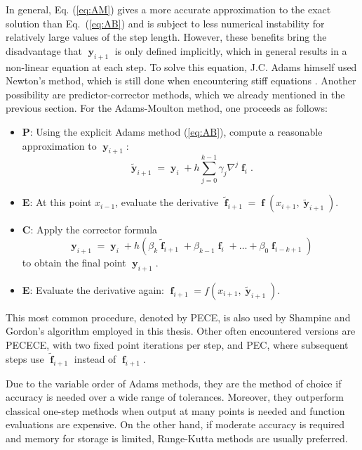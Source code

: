 In general, Eq. (\ref{eq:AM}) gives a more accurate approximation to the exact solution than \mbox{Eq. (\ref{eq:AB})} and is subject to less numerical instability for relatively large values of the step length. However, these benefits bring the disadvantage that $\mbfy_{i+1}$ is only defined implicitly, which in general results in a non-linear equation at each step. To solve this equation, J.C. Adams himself used Newton's method, which is still done when encountering stiff equations \cite{hairer2011solving}. Another possibility are predictor-corrector methods, which we already mentioned in the previous section. For the Adams-Moulton method, one proceeds as follows:
\begin{itemize}
\item[] \textbf{P}: Using the explicit Adams method (\ref{eq:AB}),  compute a reasonable approximation to $\mbfy_{i+1}$:
\[
\tilde{\mbfy}_{i+1} = \mbfy_i + h\sum_{j=0}^{k-1} \gamma_j \nabla^j \mbff_i.
\]
\item[] \textbf{E}: At this point $x_{i-1}$, evaluate the derivative
$
\tilde{\mbff}_{i+1} = \mbff(x_{i+1},\tilde{\mbfy}_{i+1}).
$
\item[] \textbf{C}: Apply the corrector formula
\[
\mbfy_{i+1} = \mbfy_i + h(\beta_k \tilde{\mbff}_{i+1} + \beta_{k-1}\mbff_i + \dots + \beta_0 \mbff_{i-k+1})
\]
to obtain the final point $\mbfy_{i+1}$.
\item[] \textbf{E}: Evaluate the derivative again:
$
\mbff_{i+1} = f(x_{i+1},\tilde{\mbfy}_{i+1})
$.
\end{itemize}
This most common procedure, denoted by PECE, is also used by Shampine and Gordon's algorithm employed in this thesis. Other often encountered versions are PECECE, with two fixed point iterations per step, and PEC, where  subsequent steps use $\tilde{\mbff}_{i+1}$ instead of $\mbff_{i+1}$.

Due to the variable order of Adams methods, they are the method of choice if accuracy is needed over a wide range of tolerances. Moreover, they outperform classical one-step methods when output at many points is needed and function evaluations are expensive. On the other hand, if moderate accuracy is required and memory for storage is limited, Runge-Kutta methods are usually preferred.

